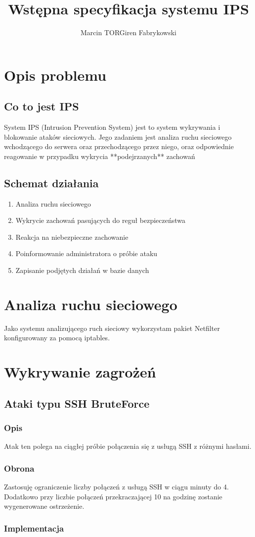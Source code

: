 \documentclass[a4paper]{article}
\author{Marcin TORGiren Fabrykowski}
\title{Wstępna specyfikacja systemu IPS}
\begin{document}
\maketitle
\newpage
\tableofcontents
\newpage
\section{Opis problemu}
\subsection{Co to jest IPS}
System IPS (Intrusion Prevention System) jest to system wykrywania i blokowanie ataków sieciowych.
Jego zadaniem jest analiza ruchu sieciowego wchodzącego do serwera oraz przechodzącego przez niego, oraz odpowiednie reagowanie w przypadku wykrycia **podejrzanych** zachowań
\subsection{Schemat działania}
\begin{enumerate}
\item Analiza ruchu sieciowego
\item Wykrycie zachowań pasujących do reguł bezpieczeństwa
\item Reakcja na niebezpieczne zachowanie
\item Poinformowanie administratora o próbie ataku
\item Zapisanie podjętych działań w bazie danych
\end{enumerate}
\section{Analiza ruchu sieciowego}
Jako systemu analizującego ruch sieciowy wykorzystam pakiet Netfilter konfigurowany za pomocą iptables.
\section{Wykrywanie zagrożeń}
\subsection{Ataki typu SSH BruteForce}
\subsubsection{Opis}
Atak ten polega na ciągłej próbie połączenia się z usługą SSH z różnymi hasłami.
\subsubsection{Obrona}
Zastosuję ograniczenie liczby połączeń z usługą SSH w ciągu minuty do 4.\\
Dodatkowo przy liczbie połączeń przekraczającej 10 na godzinę zostanie wygenerowane ostrzeżenie.
\subsubsection{Implementacja}
\end{document}
